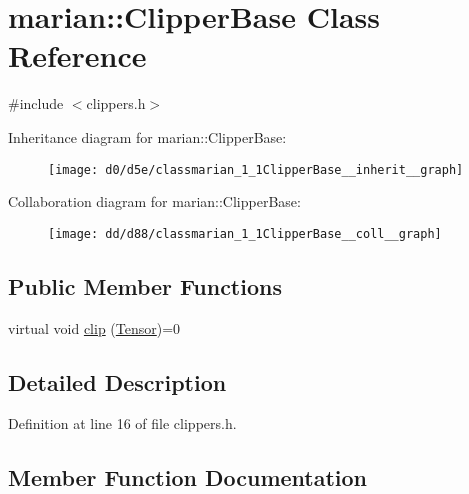 \hypertarget{classmarian_1_1ClipperBase}{}\section{marian\+:\+:Clipper\+Base Class Reference}
\label{classmarian_1_1ClipperBase}


{\ttfamily \#include $<$clippers.\+h$>$}



Inheritance diagram for marian\+:\+:Clipper\+Base\+:
\nopagebreak
\begin{figure}[H]
\begin{center}
\leavevmode
\texttt{[image: d0/d5e/classmarian\_1\_1ClipperBase\_\_inherit\_\_graph]}
\end{center}
\end{figure}


Collaboration diagram for marian\+:\+:Clipper\+Base\+:
\nopagebreak
\begin{figure}[H]
\begin{center}
\leavevmode
\texttt{[image: dd/d88/classmarian\_1\_1ClipperBase\_\_coll\_\_graph]}
\end{center}
\end{figure}
\subsection*{Public Member Functions}
\begin{DoxyCompactItemize}
\item 
virtual void \hyperlink{classmarian_1_1ClipperBase_a6f7b11e38c66ff53736ad8a6c2a90610}{clip} (\hyperlink{namespacemarian_a88b71ec34bb354564cddc24eb80f7e14}{Tensor})=0
\end{DoxyCompactItemize}


\subsection{Detailed Description}


Definition at line 16 of file clippers.\+h.



\subsection{Member Function Documentation}
